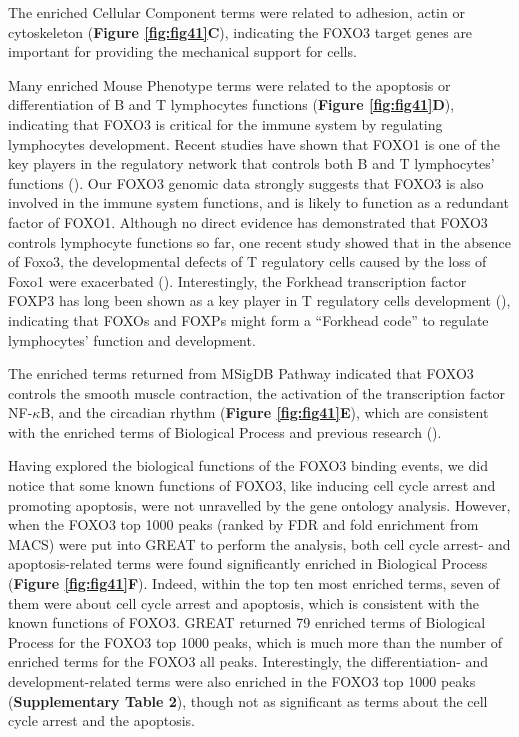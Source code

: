The enriched Cellular Component terms were related to adhesion, actin or cytoskeleton (\textbf{Figure \ref{fig:fig41}C}), indicating the FOXO3 target genes are important for providing the mechanical support for cells.

Many enriched Mouse Phenotype terms were related to the apoptosis or differentiation of B and T lymphocytes functions (\textbf{Figure \ref{fig:fig41}D}), indicating that FOXO3 is critical for the immune system by regulating lymphocytes development. Recent studies have shown that FOXO1 is one of the key players in the regulatory network that controls both B and T lymphocytes' functions (\cite{kerdiles2010foxo,lin2010a,ochiai2012a}). Our FOXO3 genomic data strongly suggests that FOXO3 is also involved in the immune system functions, and is likely to function as a redundant factor of FOXO1. Although no direct evidence has demonstrated that FOXO3 controls lymphocyte functions so far, one recent study showed that in the absence of Foxo3, the developmental defects of T regulatory cells caused by the loss of Foxo1 were exacerbated (\cite{kerdiles2010foxo}). Interestingly, the Forkhead transcription factor FOXP3 has long been shown as a key player in T regulatory cells development (\cite{hori2003control}), indicating that FOXOs and FOXPs might form a \enquote{Forkhead code} to regulate lymphocytes' function and development.

The enriched terms returned from MSigDB Pathway indicated that FOXO3 controls the smooth muscle contraction, the activation of the transcription factor NF-$\kappa$B, and the circadian rhythm (\textbf{Figure \ref{fig:fig41}E}), which are consistent with the enriched terms of Biological Process and previous research (\cite{li2012forkhead,zheng2007foxo}).

Having explored the biological functions of the FOXO3 binding events, we did notice that some known functions of FOXO3, like inducing cell cycle arrest and promoting apoptosis, were not unravelled by the gene ontology analysis. However, when the FOXO3 top 1000 peaks (ranked by FDR and fold enrichment from MACS) were put into GREAT to perform the analysis, both cell cycle arrest- and apoptosis-related terms were found significantly enriched in Biological Process (\textbf{Figure \ref{fig:fig41}F}). Indeed, within the top ten most enriched terms, seven of them were about cell cycle arrest and apoptosis, which is consistent with the known functions of FOXO3. GREAT returned 79 enriched terms of Biological Process for the FOXO3 top 1000 peaks, which is much more than the number of enriched terms for the FOXO3 all peaks. Interestingly, the differentiation- and development-related terms were also enriched in the FOXO3 top 1000 peaks (\textbf{Supplementary Table 2}), though not as significant as terms about the cell cycle arrest and the apoptosis.

